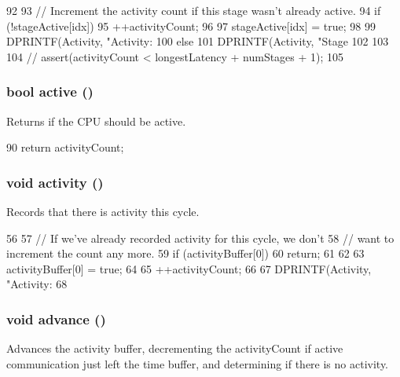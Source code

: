 \begin{DoxyCode}
92 {
93     // Increment the activity count if this stage wasn't already active.
94     if (!stageActive[idx]) {
95         ++activityCount;
96 
97         stageActive[idx] = true;
98 
99         DPRINTF(Activity, "Activity: %
100     } else {
101         DPRINTF(Activity, "Stage %
102     }
103 
104 //    assert(activityCount < longestLatency + numStages + 1);
105 }
\end{DoxyCode}
\hypertarget{classActivityRecorder_a0cb3050c8a4f6bdb2c1f727eec8d9701}{
\subsubsection[{active}]{\setlength{\rightskip}{0pt plus 5cm}bool active ()}}
\label{classActivityRecorder_a0cb3050c8a4f6bdb2c1f727eec8d9701}
Returns if the CPU should be active. 


\begin{DoxyCode}
90 { return activityCount; }
\end{DoxyCode}
\hypertarget{classActivityRecorder_a0ea760b87a5516ee794818d5eb8c243d}{
\subsubsection[{activity}]{\setlength{\rightskip}{0pt plus 5cm}void activity ()}}
\label{classActivityRecorder_a0ea760b87a5516ee794818d5eb8c243d}
Records that there is activity this cycle. 


\begin{DoxyCode}
56 {
57     // If we've already recorded activity for this cycle, we don't
58     // want to increment the count any more.
59     if (activityBuffer[0]) {
60         return;
61     }
62 
63     activityBuffer[0] = true;
64 
65     ++activityCount;
66 
67     DPRINTF(Activity, "Activity: %
68 }
\end{DoxyCode}
\hypertarget{classActivityRecorder_a8903a4e9f3d5fb42d0faa9d53e21d85c}{
\subsubsection[{advance}]{\setlength{\rightskip}{0pt plus 5cm}void advance ()}}
\label{classActivityRecorder_a8903a4e9f3d5fb42d0faa9d53e21d85c}
Advances the activity buffer, decrementing the activityCount if active communication just left the time buffer, and determining if there is no activity. 


